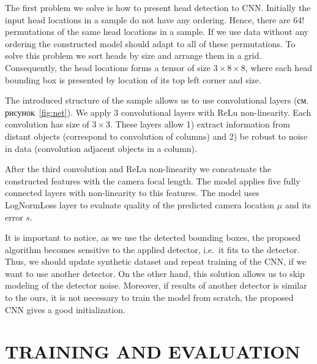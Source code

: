 The first problem we solve is how to present head detection to CNN. Initially the input head locations in a sample do not have any ordering. Hence, there are $64!$ permutations of the same head locations in a sample. If we use data without any ordering the constructed model should adapt to all of these permutations. To solve this problem we sort heads by size and arrange them in a grid. Consequently, the head locations forms a tensor of size $3\times8\times8$, where each head bounding box is presented by location of its top left corner and size.

The introduced structure of the sample allows us to use convolutional layers (см. рисунок~\ref{fig:net}). We apply 3 convolutional layers with ReLu non-linearity. Each convolution has size of $3\times3$. These layers allow 1) extract information from distant objects (correspond to convolution of columns) and 2) be robust to noise in data (convolution adjacent objects in a column).

After the third convolution and ReLu non-linearity we concatenate the constructed features with the camera focal length. The model applies five fully connected layers with non-linearity to this features. The model uses LogNormLoss layer to evaluate quality of the predicted camera location $\mu$ and its error $s$.

It is important to notice, as we use the detected bounding boxes, the proposed algorithm becomes sensitive to the applied detector, i.e.\ it fits to the detector. Thus, we should update synthetic dataset and repeat training of the CNN, if we want to use another detector. On the other hand, this solution allows us to skip modeling of the detector noise. Moreover, if results of another detector is similar to the ours, it is not necessary to train the model from scratch, the proposed CNN gives a good initialization.

\section{\uppercase{Training and Evaluation}}
\label{sec:evaluation}

